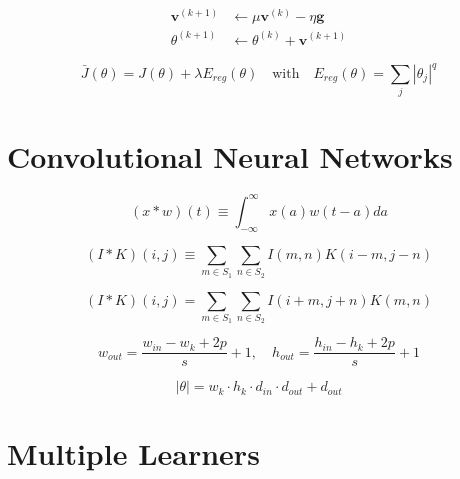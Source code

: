 \documentclass{article}
\begin{document}
\begin{equation}
    \begin{aligned}
        \mathbf{v}^{(k+1)} &\leftarrow \mu \mathbf{v}^{(k)} - \eta \mathbf{g} \\
        \theta^{(k+1)} &\leftarrow \theta^{(k)} + \mathbf{v}^{(k+1)}
    \end{aligned}
\end{equation}

\begin{equation}
    \bar{J}(\theta) = J(\theta) + \lambda E_{reg}(\theta) \quad \text{with} \quad E_{reg}(\theta) = \sum_j |\theta_j|^q
\end{equation}


\section{Convolutional Neural Networks}

\begin{equation}
    (x * w)(t) \equiv \int_{-\infty}^{\infty} x(a) w(t - a) da
\end{equation}

\begin{equation}
    (I * K)(i, j) \equiv \sum_{m \in S_1} \sum_{n \in S_2} I(m, n)K(i - m, j - n)
\end{equation}

\begin{equation}
    (I * K)(i, j) = \sum_{m \in S_1} \sum_{n \in S_2} I(i + m, j + n)K(m, n)
\end{equation}

\begin{equation}
    w_{out} = \frac{w_{in} - w_k + 2p}{s} + 1, \quad h_{out} = \frac{h_{in} - h_k + 2p}{s} + 1
\end{equation}

\begin{equation}
    |\theta| = w_k \cdot h_k \cdot d_{in} \cdot d_{out} + d_{out}
\end{equation}


\section{Multiple Learners}
\end{document}
